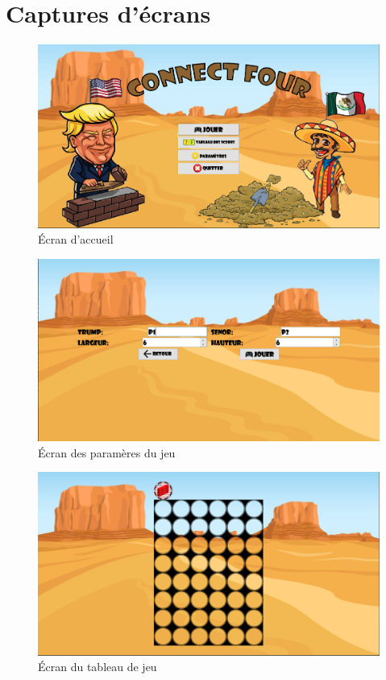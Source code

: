 \section{Captures d’écrans}

\begin{figure}[H]
    \centering
    \includegraphics[width=6in]{img/1-accueil}
    \caption{Écran d'accueil}
\end{figure}

\begin{figure}[H]
    \centering
    \includegraphics[width=6in]{img/2-parametreJeu}
    \caption{Écran des paramères du jeu}
\end{figure}

\begin{figure}[H]
    \centering
    \includegraphics[width=6in]{img/3-tableauJeu}
    \caption{Écran du tableau de jeu}
\end{figure}

